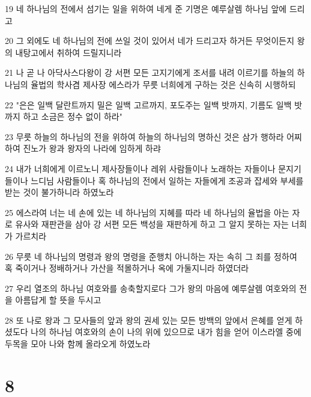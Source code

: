\par 19 네 하나님의 전에서 섬기는 일을 위하여 네게 준 기명은 예루살렘 하나님 앞에 드리고
\par 20 그 외에도 네 하나님의 전에 쓰일 것이 있어서 네가 드리고자 하거든 무엇이든지 왕의 내탕고에서 취하여 드릴지니라
\par 21 나 곧 나 아닥사스다왕이 강 서편 모든 고지기에게 조서를 내려 이르기를 하늘의 하나님의 율법의 학사겸 제사장 에스라가 무릇 너희에게 구하는 것은 신속히 시행하되
\par 22 "은은 일백 달란트까지 밀은 일백 고르까지, 포도주는 일백 밧까지, 기름도 일백 밧까지 하고 소금은 정수 없이 하라"
\par 23 무릇 하늘의 하나님의 전을 위하여 하늘의 하나님의 명하신 것은 삼가 행하라 어찌하여 진노가 왕과 왕자의 나라에 임하게 하랴
\par 24 내가 너희에게 이르노니 제사장들이나 레위 사람들이나 노래하는 자들이나 문지기들이나 느디님 사람들이나 혹 하나님의 전에서 일하는 자들에게 조공과 잡세와 부세를 받는 것이 불가하니라 하였노라
\par 25 에스라여 너는 네 손에 있는 네 하나님의 지혜를 따라 네 하나님의 율법을 아는 자로 유사와 재판관을 삼아 강 서편 모든 백성을 재판하게 하고 그 알지 못하는 자는 너희가 가르치라
\par 26 무릇 네 하나님의 명령과 왕의 명령을 준행치 아니하는 자는 속히 그 죄를 정하여 혹 죽이거나 정배하거나 가산을 적몰하거나 옥에 가둘지니라 하였더라
\par 27 우리 열조의 하나님 여호와를 송축할지로다 그가 왕의 마음에 예루살렘 여호와의 전을 아름답게 할 뜻을 두시고
\par 28 또 나로 왕과 그 모사들의 앞과 왕의 권세 있는 모든 방백의 앞에서 은혜를 얻게 하셨도다 나의 하나님 여호와의 손이 나의 위에 있으므로 내가 힘을 얻어 이스라엘 중에 두목을 모아 나와 함께 올라오게 하였노라

\chapter{8}

